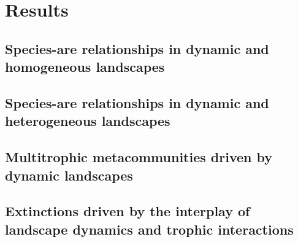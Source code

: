 \section{Results}

\vspace{0.25cm}
\subsection*{Species-are relationships in dynamic and homogeneous landscapes}

\subsection*{Species-are relationships in dynamic and heterogeneous landscapes}


\vspace{0.25cm}
\subsection*{Multitrophic metacommunities driven by dynamic landscapes}

\vspace{0.25cm}
\subsection*{Extinctions driven by the interplay of landscape dynamics and trophic interactions}


